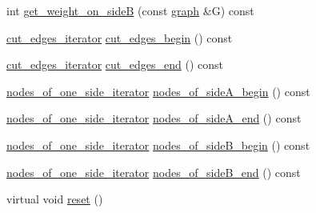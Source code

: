 \begin{DoxyCompactItemize}
\item 
int \mbox{\hyperlink{classratio__cut__partition_abd0835eeaec80f5ba56de5428985259f}{get\+\_\+weight\+\_\+on\+\_\+sideB}} (const \mbox{\hyperlink{classgraph}{graph}} \&G) const
\item 
\mbox{\hyperlink{classratio__cut__partition_a5269af60e49810067411b085a1341adc}{cut\+\_\+edges\+\_\+iterator}} \mbox{\hyperlink{classratio__cut__partition_a657a1d77b3b39037a52e6688674ad760}{cut\+\_\+edges\+\_\+begin}} () const
\item 
\mbox{\hyperlink{classratio__cut__partition_a5269af60e49810067411b085a1341adc}{cut\+\_\+edges\+\_\+iterator}} \mbox{\hyperlink{classratio__cut__partition_a8609d76a4d74cb3b2596ac370c839fce}{cut\+\_\+edges\+\_\+end}} () const
\item 
\mbox{\hyperlink{classratio__cut__partition_a4f667099b56ded1bfef8f1fb4d09f81c}{nodes\+\_\+of\+\_\+one\+\_\+side\+\_\+iterator}} \mbox{\hyperlink{classratio__cut__partition_a0c569bb7bd0a94269bd8938a2e0fce85}{nodes\+\_\+of\+\_\+side\+A\+\_\+begin}} () const
\item 
\mbox{\hyperlink{classratio__cut__partition_a4f667099b56ded1bfef8f1fb4d09f81c}{nodes\+\_\+of\+\_\+one\+\_\+side\+\_\+iterator}} \mbox{\hyperlink{classratio__cut__partition_a497d63a55cf326f62b97d0c77be094c7}{nodes\+\_\+of\+\_\+side\+A\+\_\+end}} () const
\item 
\mbox{\hyperlink{classratio__cut__partition_a4f667099b56ded1bfef8f1fb4d09f81c}{nodes\+\_\+of\+\_\+one\+\_\+side\+\_\+iterator}} \mbox{\hyperlink{classratio__cut__partition_ae36c08387ff6eae1236076cdbabf4fa5}{nodes\+\_\+of\+\_\+side\+B\+\_\+begin}} () const
\item 
\mbox{\hyperlink{classratio__cut__partition_a4f667099b56ded1bfef8f1fb4d09f81c}{nodes\+\_\+of\+\_\+one\+\_\+side\+\_\+iterator}} \mbox{\hyperlink{classratio__cut__partition_a838e3ab6d00155c1f3868cc920a4a8f6}{nodes\+\_\+of\+\_\+side\+B\+\_\+end}} () const
\item 
virtual void \mbox{\hyperlink{classratio__cut__partition_ad017eaf98f9ae4ca9dbe6b3eda9fc94d}{reset}} ()
\end{DoxyCompactItemize}
